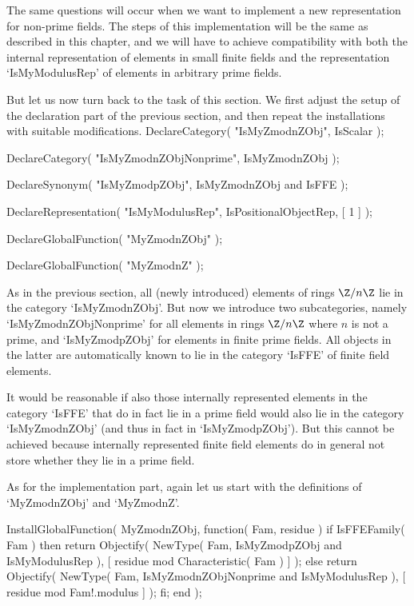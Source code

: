 The same questions will occur when we want to implement a new
representation for non-prime fields.
The steps of this implementation will be the same as described in this
chapter,
and we will have to achieve compatibility with both the internal
representation of elements in small finite fields and the representation
`IsMyModulusRep' of elements in arbitrary prime fields.

But let us now turn back to the task of this section.
We first adjust the setup of the declaration part of the previous section,
and then repeat the installations with suitable modifications.
\begintt
DeclareCategory( "IsMyZmodnZObj", IsScalar );

DeclareCategory( "IsMyZmodnZObjNonprime", IsMyZmodnZObj );

DeclareSynonym( "IsMyZmodpZObj", IsMyZmodnZObj and IsFFE );

DeclareRepresentation( "IsMyModulusRep", IsPositionalObjectRep, [ 1 ] );

DeclareGlobalFunction( "MyZmodnZObj" );

DeclareGlobalFunction( "MyZmodnZ" );
\endtt

As in the previous section,
all (newly introduced) elements of rings $\Z/n\Z$ lie in the category
`IsMyZmodnZObj'.
But now we introduce two subcategories, namely `IsMyZmodnZObjNonprime'
for all elements in rings $\Z/n\Z$ where $n$ is not a prime,
and `IsMyZmodpZObj' for elements in finite prime fields.
All objects in the latter are automatically known to lie in the
category `IsFFE' of finite field elements.

It would be reasonable if also those internally represented elements
in the category `IsFFE' that do in fact lie in a prime field
would also  lie in the category `IsMyZmodnZObj' (and thus in fact in
`IsMyZmodpZObj').
But this cannot be achieved because internally represented finite field
elements do in general not store whether they lie in a prime field.

As for the implementation part,
again let us start with the definitions of `MyZmodnZObj' and `MyZmodnZ'.

\begintt
InstallGlobalFunction( MyZmodnZObj, function( Fam, residue )
if IsFFEFamily( Fam ) then
  return Objectify( NewType( Fam,     IsMyZmodpZObj
                                  and IsMyModulusRep ),
                    [ residue mod Characteristic( Fam ) ] );
else
  return Objectify( NewType( Fam,     IsMyZmodnZObjNonprime
                                  and IsMyModulusRep ),
                    [ residue mod Fam!.modulus ] );
fi;
end );


